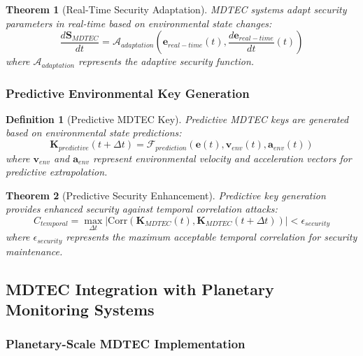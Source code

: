 \documentclass[12pt,a4paper]{article}
\newtheorem{theorem}{Theorem}
\newtheorem{definition}{Definition}
\begin{document}
\begin{theorem}[Real-Time Security Adaptation]
MDTEC systems adapt security parameters in real-time based on environmental state changes:
\begin{equation}
\frac{d\mathbf{S}_{MDTEC}}{dt} = \mathcal{A}_{adaptation}\left(\mathbf{e}_{real-time}(t), \frac{d\mathbf{e}_{real-time}}{dt}(t)\right)
\end{equation}
where $\mathcal{A}_{adaptation}$ represents the adaptive security function.
\end{theorem}

\subsubsection{Predictive Environmental Key Generation}

\begin{definition}[Predictive MDTEC Key]
Predictive MDTEC keys are generated based on environmental state predictions:
\begin{equation}
\mathbf{K}_{predictive}(t+\Delta t) = \mathcal{F}_{prediction}(\mathbf{e}(t), \mathbf{v}_{env}(t), \mathbf{a}_{env}(t))
\end{equation}
where $\mathbf{v}_{env}$ and $\mathbf{a}_{env}$ represent environmental velocity and acceleration vectors for predictive extrapolation.
\end{definition}

\begin{theorem}[Predictive Security Enhancement]
Predictive key generation provides enhanced security against temporal correlation attacks:
\begin{equation}
C_{temporal} = \max_{\Delta t} \left| \text{Corr}(\mathbf{K}_{MDTEC}(t), \mathbf{K}_{MDTEC}(t+\Delta t)) \right| < \epsilon_{security}
\end{equation}
where $\epsilon_{security}$ represents the maximum acceptable temporal correlation for security maintenance.
\end{theorem}

\subsection{MDTEC Integration with Planetary Monitoring Systems}

\subsubsection{Planetary-Scale MDTEC Implementation}
\end{document}
